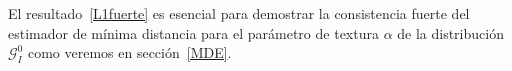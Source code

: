 \begin{itemize}

\end{itemize}

El resultado~\ref{L1fuerte} es esencial para demostrar la consistencia fuerte del estimador de mínima distancia para el parámetro de textura $\alpha$ de la distribución $\mathcal{G}_I^0$ como veremos en sección~\ref{MDE}.

